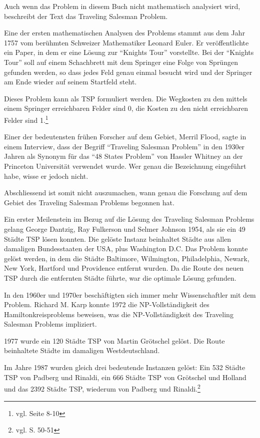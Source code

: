 \documentclass[11pt,a4paper]{article}
\begin{document}
Auch wenn das Problem in diesem Buch nicht mathematisch analysiert wird, beschreibt der Text das Traveling Salesman Problem. 

Eine der ersten mathematischen Analysen des Problems stammt aus dem Jahr 1757 vom berühmten Schweizer Mathematiker Leonard Euler. Er veröffentlichte ein Paper, in dem er eine Lösung zur "`Knights Tour"' vorstellte. Bei der "`Knights Tour"' soll auf einem Schachbrett mit dem Springer eine Folge von Sprüngen gefunden werden, so dass jedes Feld genau einmal besucht wird und der Springer am Ende wieder auf seinem Startfeld steht.

Dieses Problem kann als TSP formuliert werden. Die Wegkosten zu den mittels einem Springer erreichbaren Felder sind 0, die Kosten zu den nicht erreichbaren Felder sind 1.\footnote{vgl. \cite{applegate06} Seite 8-10}

\medskip

Einer der bedeutensten frühen Forscher auf dem Gebiet, Merril Flood, sagte in einem Interview, dass der Begriff "`Traveling Salesman Problem"' in den 1930er Jahren als Synonym für das "`48 States Problem"' von Hassler Whitney an der Princeton Universität verwendet wurde. Wer genau die Bezeichnung eingeführt habe, wisse er jedoch nicht.\cite{interview_merrill_flood84}

Abschliessend ist somit nicht auszumachen, wann genau die Forschung auf dem Gebiet des Traveling Salesman Problems begonnen hat.

\medskip

Ein erster Meilenstein im Bezug auf die Lösung des Traveling Salesman Problems gelang George Dantzig, Ray Fulkerson und Selmer Johnson 1954, als sie ein 49 Städte TSP lösen konnten. Die gelöste Instanz beinhaltet Städte aus allen damaligen Bundesstaaten der USA, plus Washington D.C. Das Problem konnte gelöst werden, in dem die Städte Baltimore, Wilmington, Philadelphia, Newark, New York, Hartford und Providence entfernt wurden. Da die Route des neuen TSP durch die entfernten Städte führte, war die optimale Lösung gefunden.

In den 1960er und 1970er beschäftigten sich immer mehr Wissenschaftler mit dem Problem. Richard M. Karp konnte 1972 die NP-Vollständigkeit des Hamiltonkreisproblems beweisen, was die NP-Vollständigkeit des Traveling Salesman Problems impliziert.

1977 wurde ein 120 Städte TSP von Martin Grötschel gelöst. Die Route beinhaltete Städte im damaligen Westdeutschland.

Im Jahre 1987 wurden gleich drei bedeutende Instanzen gelöst: Ein 532 Städte TSP von Padberg und Rinaldi, ein 666 Städte TSP von Grötschel und Holland und das 2392 Städte TSP, wiederum von Padberg und Rinaldi.\footnote{vgl. \cite{applegate06} S. 50-51}
\end{document}
